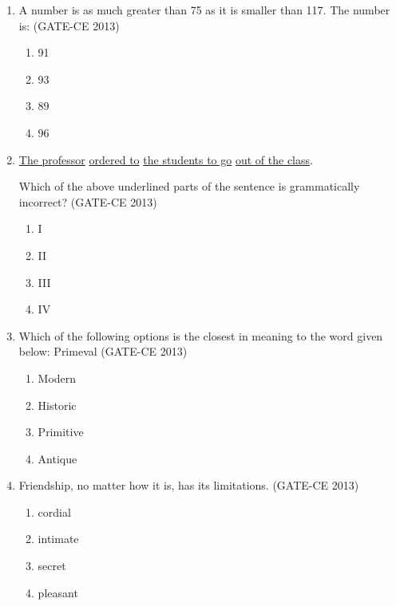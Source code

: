 \documentclass[journal,12pt,onecolumn]{article}
\theoremstyle{remark}
\begin{document}
\begin{enumerate}
    \item A number is as much greater than 75 as it is smaller than 117. The number is: (GATE-CE 2013)
    \begin{multicols}{4}
    \begin{enumerate}
        \item 91 
        \item 93 
        \item 89 
        \item 96
    \end{enumerate}
    \end{multicols}
    
\item \underline{The professor}  \underline{ordered to}   \underline{the students to go}  \underline{out of the class}.

Which of the above underlined parts of the sentence is grammatically incorrect? (GATE-CE 2013)
    \begin{multicols}{4}
    \begin{enumerate}
        \item I 
        \item II 
        \item III 
        \item IV
    \end{enumerate}
    \end{multicols}
    
    \item Which of the following options is the closest in meaning to the word given below:
    Primeval (GATE-CE 2013)
    \begin{multicols}{4}
    \begin{enumerate}
        \item Modern 
        \item Historic 
        \item Primitive 
        \item Antique
    \end{enumerate}
    \end{multicols}
    
    \item Friendship, no matter how \underline{\hspace{1cm}} it is, has its limitations. (GATE-CE 2013)
    \begin{multicols}{4}
    \begin{enumerate}
        \item cordial 
        \item intimate 
        \item secret 
        \item pleasant
    \end{enumerate}
    \end{multicols}
    

\end{enumerate}
\end{document}
